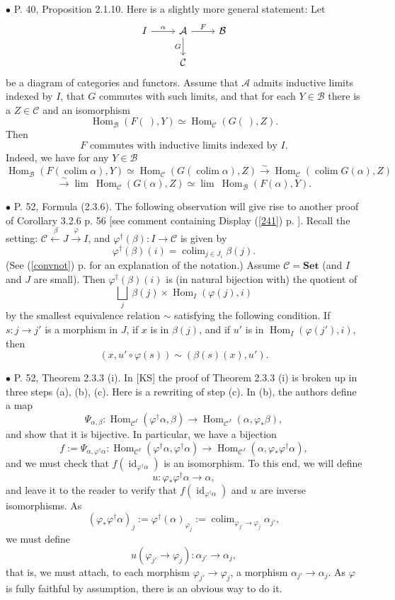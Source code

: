 \documentclass[12pt]{article}
\theoremstyle{remark}
\newcommand{\bu}{\bullet}
\newcommand{\n}{\noindent}
\newcommand{\A}{\mathcal A}
\newcommand{\B}{\mathcal B}
\newcommand{\C}{\mathcal C}
\newcommand{\Set}{\textbf{Set}}
\newcommand{\p}{\varphi}
\newcommand{\cn}{(See (\ref{convnot}) p. \pageref{convnot} for an explanation of the notation.) }
\DeclareMathOperator*{\coli}{colim}
\DeclareMathOperator{\id}{id}
\DeclareMathOperator{\Hom}{Hom}
\DeclareMathOperator{\h}{Hom}
\begin{document}
%

\n$\bu$ P. 40, Proposition 2.1.10. Here is a slightly more general statement: Let 
$$
\begin{tikzcd}
I\ar{r}{\alpha}&\A\ar{d}[swap]{G}\ar{r}{F}&\B\\
&\C
\end{tikzcd}
$$
be a diagram of categories and functors. Assume that $\A$ admits inductive limits indexed by $I$, that $G$ commutes with such limits, and that for each $Y\in\B$ there is a $Z\in\C$ and an isomorphism 
$$
\Hom_\B(F(\ ),Y)\simeq\Hom_\C(G(\ ),Z). 
$$
Then 
\begin{equation}\label{2.1.10}
F\text{ commutes with inductive limits indexed by }I.
\end{equation}
Indeed, we have for any $Y\in\B$ 
$$ 
\Hom_\B\left(F\left(\coli\alpha\right),Y\right)\simeq
\Hom_\C\left(G\left(\coli\alpha\right),Z\right)
\overset{\sim}{\to}
\Hom_\C\left(\coli G(\alpha),Z\right)
$$
$$
\overset{\sim}{\to}\lim \ \Hom_\C(G(\alpha),Z)\simeq\lim \ \Hom_\B(F(\alpha),Y).
$$  


\n$\bu$ P. 52, Formula (2.3.6). The following observation will give rise to another proof of Corollary 3.2.6 p. 56 [see comment containing Display (\ref{241}) p. \pageref{241}]. Recall the setting: $\C\xleftarrow{\,\beta}J\xrightarrow{\p}I$, and $\p^\dagger(\beta):I\to\C$ is given by 
%
\begin{equation}\label{236}
\p^\dagger(\beta)(i)=\coli_{j\in J_i}\beta(j).
\end{equation}
%  
\cn Assume $\C=\Set$ (and $I$ and $J$ are small). Then $\p^\dagger(\beta)(i)$ is (in natural bijection with) the quotient of 
$$
\bigsqcup_j\ \beta(j)\times\h_I(\p(j),i) 
$$ 
by the smallest equivalence relation $\sim$ satisfying the following condition. If $s:j\to j'$ is a morphism in $J$, if $x$ is in $\beta(j)$, and if $u'$ is in $\h_I(\p(j'),i)$, then 
$$
(x,u'\circ\p(s))\sim(\beta(s)(x),u'). 
$$ 


\n$\bu$ P. 52, Theorem 2.3.3 (i). In [KS] the proof of Theorem 2.3.3 (i) is broken up in three steps (a), (b), (c). Here is a rewriting of step (c). In (b), the authors define a map 
$$
\Psi_{\alpha,\beta}:
\Hom_{\C^I}(\varphi^\dagger\alpha,\beta)\to
\Hom_{\C^J}(\alpha,\varphi_*\beta),
$$
and show that it is bijective. In particular, we have a bijection 
$$
f:=\Psi_{\alpha,\varphi^\dagger\alpha}:
\Hom_{\C^I}(\varphi^\dagger\alpha,\varphi^\dagger\alpha)\to
\Hom_{\C^J}(\alpha,\varphi_*\varphi^\dagger\alpha),
$$
and we must check that $f(\id_{\varphi^\dagger\alpha})$ is an isomorphism. To this end, we will define 
$$
u:\varphi_*\varphi^\dagger\alpha\to\alpha,
$$
and leave it to the reader to verify that $f(\id_{\varphi^\dagger\alpha})$ and $u$ are inverse isomorphisms. As 
$$
(\varphi_*\varphi^\dagger\alpha)_j:=\varphi^\dagger(\alpha)_{\varphi_j}:=\coli_{\varphi_{j'}\to\varphi_j}\alpha_{j'},
$$
we must define 
$$
u(\varphi_{j'}\to\varphi_j):\alpha_{j'}\to\alpha_j,
$$
that is, we must attach, to each morphism $\varphi_{j'}\to\varphi_j$, a morphism $\alpha_{j'}\to\alpha_j$. As $\varphi$ is fully faithful by assumption, there is an obvious way to do it. 
\end{document}
